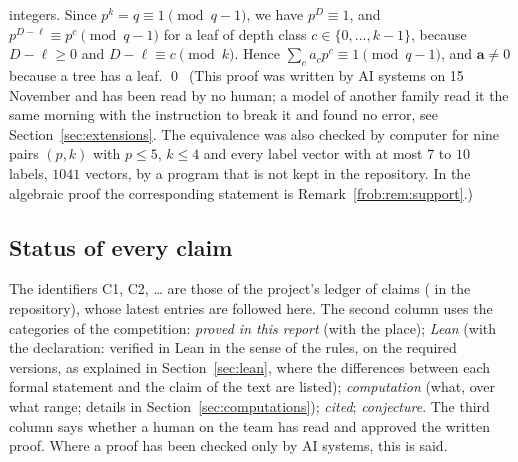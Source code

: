 \documentclass[11pt]{article}
\theoremstyle{definition}
\theoremstyle{remark}
\numberwithin{equation}{section}
\numberwithin{figure}{section}
\begin{document}
integers. Since $p^k=q\equiv1\pmod{q-1}$, we have $p^{D}\equiv1$, and $p^{D-\ell}\equiv p^{c}\pmod{q-1}$ for a
leaf of depth class $c\in\{0,\dots,k-1\}$, because $D-\ell\ge0$ and $D-\ell\equiv c\pmod k$. Hence
$\sum_ca_cp^c\equiv1\pmod{q-1}$, and $\mathbf a\ne0$ because a tree has a leaf. \qed\ (This proof was written by
AI systems on 15 November and has been read by no human; a model of another family read it the same morning
with the instruction to break it and found no error, see Section~\ref{sec:extensions}. The equivalence was also checked by computer for nine
pairs $(p,k)$ with $p\le5$, $k\le4$ and every label vector with at most $7$ to $10$ labels, $1041$ vectors, by
a program that is not kept in the repository. In the algebraic proof the corresponding statement is
Remark~\ref{frob:rem:support}.)

\subsection{Status of every claim}\label{sec:status}
The identifiers C1, C2, \dots{} are those of the project's ledger of claims ( in the
repository), whose latest entries are followed here. The second column uses the categories of the
competition: \emph{proved in this report} (with the place); \emph{Lean} (with the declaration: verified in
Lean in the sense of the rules, on the required versions, as explained in Section~\ref{sec:lean}, where the
differences between each formal statement and the claim of the text are listed);
\emph{computation} (what, over what range; details in Section~\ref{sec:computations}); \emph{cited};
\emph{conjecture}. The third column says whether a human on the team has read and approved the written proof.
Where a proof has been checked only by AI systems, this is said.
\end{document}
